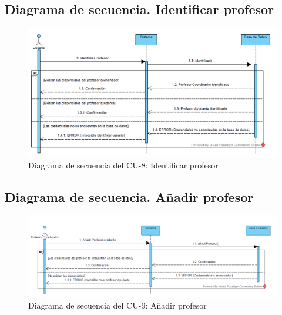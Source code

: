 \subsection{Diagrama de secuencia. Identificar profesor}
\begin{figure}[h!]
	\centering
	\includegraphics[width=1\textwidth]{../design/sd-8}
	\caption{Diagrama de secuencia del CU-8: Identificar profesor}
	\label{fig:sd008}
\end{figure}

\subsection{Diagrama de secuencia. Añadir profesor}
\begin{figure}[h!]
	\centering
	\includegraphics[width=1\textwidth]{../design/sd-9}
	\caption{Diagrama de secuencia del CU-9: Añadir profesor}
	\label{fig:sd009}
\end{figure}
